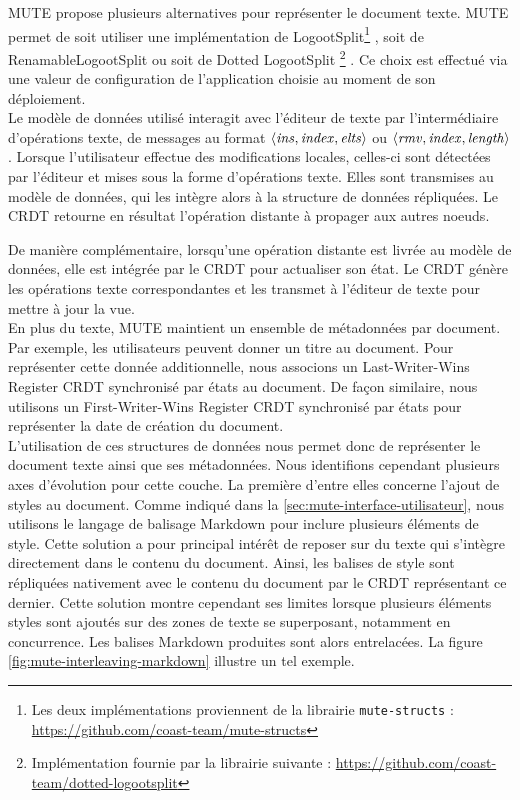 \label{sec:mute-crdts}

MUTE propose plusieurs alternatives pour représenter le document texte.
MUTE permet de soit utiliser une implémentation de LogootSplit\footnote{Les deux implémentations proviennent de la librairie \texttt{mute-structs} : \url{https://github.com/coast-team/mute-structs}} , soit de RenamableLogootSplit\footnotemark[\value{footnote}]  ou soit de Dotted LogootSplit \footnote{Implémentation fournie par la librairie suivante : \url{https://github.com/coast-team/dotted-logootsplit}} \cite{2021-these-vic}.
Ce choix est effectué via une valeur de configuration de l'application choisie au moment de son déploiement.\\

Le modèle de données utilisé interagit avec l'éditeur de texte par l'intermédiaire d'opérations texte, \ie de messages au format $\langle \mathit{ins}, \mathit{index},\mathit{elts} \rangle$ ou $\langle \mathit{rmv}, \mathit{index}, \mathit{length} \rangle$.
Lorsque l'utilisateur effectue des modifications locales, celles-ci sont détectées par l'éditeur et mises sous la forme d'opérations texte.
Elles sont transmises au modèle de données, qui les intègre alors à la structure de données répliquées.
Le \ac{CRDT} retourne en résultat l'opération distante à propager aux autres noeuds.

De manière complémentaire, lorsqu'une opération distante est livrée au modèle de données, elle est intégrée par le \ac{CRDT} pour actualiser son état.
Le \ac{CRDT} génère les opérations texte correspondantes et les transmet à l'éditeur de texte pour mettre à jour la vue.\\

En plus du texte, MUTE maintient un ensemble de métadonnées par document.
Par exemple, les utilisateurs peuvent donner un titre au document.
Pour représenter cette donnée additionnelle, nous associons un Last-Writer-Wins Register \ac{CRDT} synchronisé par états \cite{shapiro_2011_crdt} au document.
De façon similaire, nous utilisons un First-Writer-Wins Register \ac{CRDT} synchronisé par états pour représenter la date de création du document.\\

L'utilisation de ces structures de données nous permet donc de représenter le document texte ainsi que ses métadonnées.
Nous identifions cependant plusieurs axes d'évolution pour cette couche.
La première d'entre elles concerne l'ajout de styles au document.
Comme indiqué dans la \autoref{sec:mute-interface-utilisateur}, nous utilisons le langage de balisage Markdown pour inclure plusieurs éléments de style.
Cette solution a pour principal intérêt de reposer sur du texte qui s'intègre directement dans le contenu du document.
Ainsi, les balises de style sont répliquées nativement avec le contenu du document par le \ac{CRDT} représentant ce dernier.
Cette solution montre cependant ses limites lorsque plusieurs éléments styles sont ajoutés sur des zones de texte se superposant, notamment en concurrence.
Les balises Markdown produites sont alors entrelacées.
La figure \autoref{fig:mute-interleaving-markdown} illustre un tel exemple.

